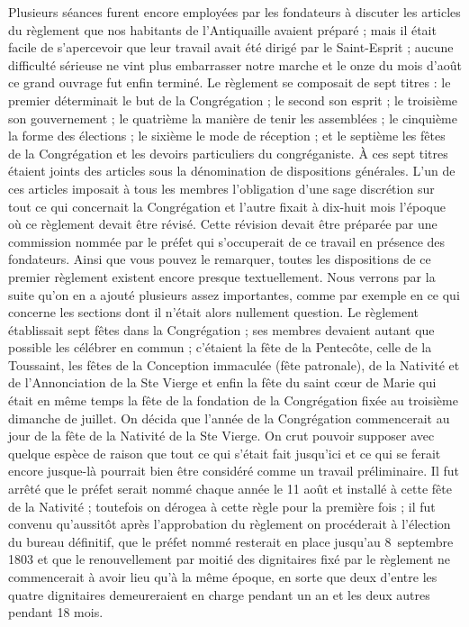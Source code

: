 Plusieurs séances furent encore employées par les fondateurs à discuter les articles du règlement que nos habitants de
l'Antiquaille avaient préparé ; mais il était facile de s'apercevoir que leur travail avait été dirigé par le Saint-Esprit ; aucune difficulté sérieuse ne vint plus embarrasser notre marche et le onze du mois d'août ce grand ouvrage fut enfin terminé. Le règlement se composait de sept titres : le premier déterminait le but de la Congrégation ; le second son esprit ; le troisième son gouvernement ; le quatrième la manière de tenir les assemblées ; le cinquième la forme des élections ; le sixième le mode de réception ; et le septième les fêtes de la Congrégation et les devoirs particuliers du congréganiste. À ces sept titres étaient joints des articles sous la dénomination de dispositions générales. L'un de ces articles imposait à tous les membres l'obligation d'une sage discrétion sur tout ce qui concernait la Congrégation et l'autre fixait à dix-huit mois l'époque où ce règlement devait être révisé. Cette révision devait être préparée par une commission nommée par le préfet qui s'occuperait de ce travail en présence des fondateurs. Ainsi que vous pouvez le remarquer, toutes les dispositions de ce premier règlement existent encore presque textuellement. Nous verrons par la suite qu'on en a ajouté plusieurs assez importantes, comme par exemple en ce qui concerne les sections dont il n'était alors nullement question. Le règlement établissait sept fêtes dans la Congrégation ; ses membres devaient autant que possible les célébrer en commun ; c'étaient la fête de la Pentecôte, celle de la Toussaint, les fêtes de la Conception immaculée
(fête patronale), de la Nativité et de l'Annonciation de la Ste Vierge et enfin la fête du saint cœur de Marie qui était en même temps la fête de la fondation de la Congrégation fixée au troisième dimanche de juillet. On décida que l'année de la Congrégation commencerait au jour de la fête de la Nativité de la Ste Vierge. On crut pouvoir supposer avec quelque espèce de raison que tout ce qui s'était fait jusqu'ici et ce qui se ferait encore jusque-là pourrait bien être considéré comme un travail préliminaire. Il fut arrêté que le préfet serait nommé chaque année le 11 août et installé à cette fête de la Nativité ; toutefois on dérogea à cette règle pour la première fois ; il fut convenu qu'aussitôt après l'approbation du règlement on procéderait à l'élection du bureau définitif, que le préfet nommé resterait en place jusqu'au 8~septembre 1803 et que le renouvellement par moitié des dignitaires fixé par le règlement ne commencerait à avoir lieu qu'à la même époque, en sorte que deux d'entre les quatre dignitaires demeureraient en charge pendant un an et les deux autres pendant 18 mois.

